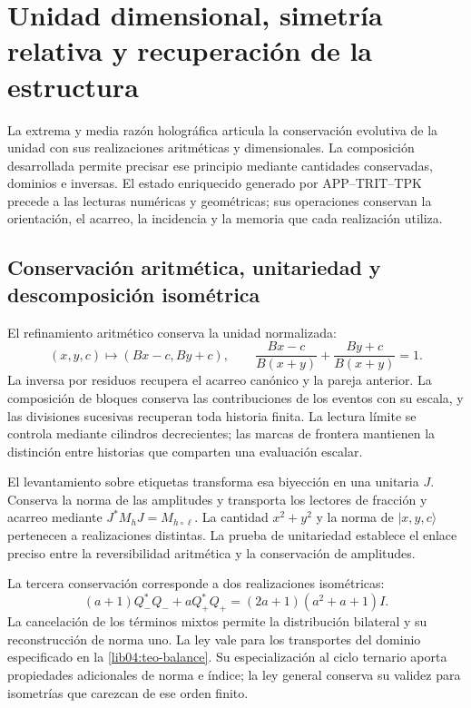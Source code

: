\section{Unidad dimensional, simetría relativa y recuperación de la estructura}
\label{lib06:sintesis}

La extrema y media razón holográfica articula la conservación evolutiva
de la unidad con sus realizaciones aritméticas y dimensionales. La
composición desarrollada permite precisar ese principio mediante
cantidades conservadas, dominios e inversas. El estado enriquecido
generado por APP--TRIT--TPK precede a las lecturas numéricas y
geométricas; sus operaciones conservan la orientación, el acarreo,
la incidencia y la memoria que cada realización utiliza.

\subsection{Conservación aritmética, unitariedad y descomposición isométrica}
\label{lib06:tres-conservaciones}

El refinamiento aritmético conserva la unidad normalizada:
\begin{equation}
 (x,y,c)\longmapsto(Bx-c,By+c),\qquad
 \frac{Bx-c}{B(x+y)}+\frac{By+c}{B(x+y)}=1.
 \label{lib06:unidad}
\end{equation}
La inversa por residuos recupera el acarreo canónico y la pareja
anterior. La composición de bloques conserva las contribuciones de
los eventos con su escala, y las divisiones sucesivas recuperan toda
historia finita. La lectura límite se controla mediante cilindros
decrecientes; las marcas de frontera mantienen la distinción entre
historias que comparten una evaluación escalar.

El levantamiento sobre etiquetas transforma esa biyección en una
unitaria \(J\). Conserva la norma de las amplitudes y transporta
los lectores de fracción y acarreo mediante
\(J^*M_hJ=M_{h\circ\ell}\). La cantidad \(x^2+y^2\) y la norma
de \(|x,y,c\rangle\) pertenecen a realizaciones distintas. La
prueba de unitariedad establece el enlace preciso entre la
reversibilidad aritmética y la conservación de amplitudes.

La tercera conservación corresponde a dos realizaciones isométricas:
\begin{equation}
 (a+1)Q_-^*Q_-+aQ_+^*Q_+
 =(2a+1)(a^2+a+1)I.
 \label{lib06:balance}
\end{equation}
La cancelación de los términos mixtos permite la distribución
bilateral y su reconstrucción de norma uno. La ley vale para los
transportes del dominio especificado en la
\cref{lib04:teo-balance}. Su especialización al ciclo ternario
aporta propiedades adicionales de norma e índice; la ley general
conserva su validez para isometrías que carezcan de ese orden finito.

